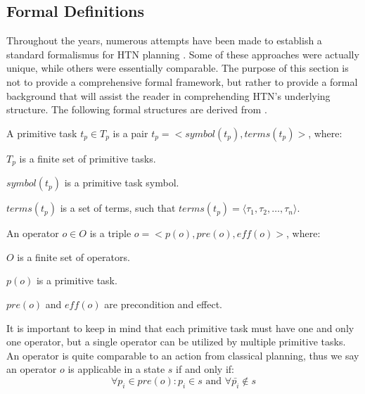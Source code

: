 \subsection{Formal Definitions}
Throughout the years, numerous attempts have been made to establish a standard formalismus for HTN planning \cite{bercher_survey_2019}. Some of these approaches were actually unique, while others were essentially comparable. The purpose of this section is not to provide a comprehensive formal framework, but rather to provide a formal background that will assist the reader in comprehending HTN's underlying structure. The following formal structures are derived from \cite{OverviewHierarchicalTaskgeorgievski2014} \cite{alnazer2019htn}.

\begin{Tdef}
    A primitive task  $t_p \in T_p$ is a pair $t_p = <symbol(t_p),terms(t_p)>$, where:
    \vspace{-0.5em}
    \begin{compactitem}
    \item 
    $T_p$ is a finite set of primitive tasks.
    \item 
    $symbol(t_p)$ is a primitive task symbol.
    \item 
    $terms(t_p)$  is a set of terms, such that $terms(t_p) = \langle \tau_1, \tau_2, \dots, \tau_n \rangle$.
    \end{compactitem}
\end{Tdef}

\begin{Tdef}[Operator]
    An operator $o \in O$ is a triple $o = <p(o), pre(o), eff(o)>$, where:
    \vspace{-0.5em}
    \begin{compactitem}
    \item 
    $O$ is a finite set of operators.
    \item 
    $p(o)$ is a primitive task.
    \item 
    $pre(o)$ and $eff(o)$ are precondition and effect.
    \end{compactitem}
    It is important to keep in mind that each primitive task must have one and only one operator, but a single operator can be utilized by multiple primitive tasks.
    An operator is quite comparable to an action from classical planning, thus we say an operator $o$ is applicable in a state $s$ if and only if:
    \vspace{-0.5em}
    $$\forall p_i \in pre(o): p_i\in s \text{ and } \forall \bar{p_i} \notin s$$
\end{Tdef}

